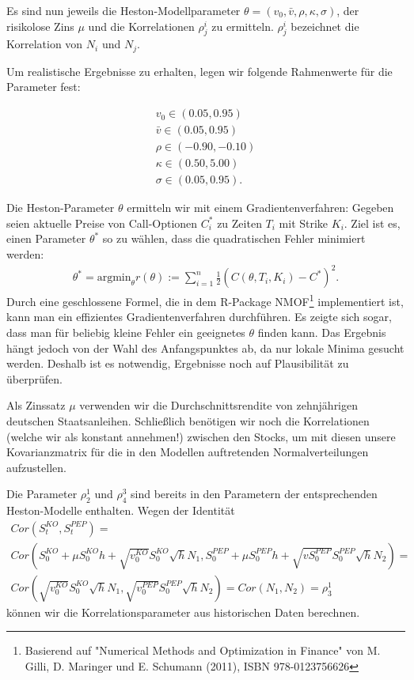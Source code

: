 \documentclass[12pt]{article}
\begin{document}
	Es sind nun jeweils die Heston-Modellparameter $\theta=(v_0,\bar v, \rho, \kappa, \sigma)$, der risikolose Zins $\mu$ und die Korrelationen $\rho^i_j$ zu ermitteln. $\rho^{i}_j$ bezeichnet die Korrelation von $N_i$ und $N_j$.
	
	Um realistische Ergebnisse zu erhalten, legen wir folgende Rahmenwerte für die Parameter fest:
	
	
	
	
	
	
	\begin{gather*}
	v_0 \in (0.05,0.95) \\
	\bar v  \in (0.05,0.95) \\
	\rho \in (-0.90,-0.10) \\
	\kappa \in (0.50,5.00) \\
	\sigma \in (0.05,0.95).
	\end{gather*}
	
	
	
	
	Die Heston-Parameter $\theta$ ermitteln wir mit einem Gradientenverfahren: Gegeben seien aktuelle Preise von Call-Optionen $C_i^*$ zu Zeiten $T_i$ mit Strike $K_i$. Ziel ist es, einen Parameter $\theta^*$ so zu wählen, dass die quadratischen Fehler minimiert werden:
	\begin{gather*}
	\theta^*=\text{argmin}_{\theta} r(\theta):=\sum_{i=1}^n \frac12 (C(\theta,T_i,K_i)-C^*)^2.
	\end{gather*}
	Durch eine geschlossene Formel, die in dem R-Package \glqq NMOF\grqq\footnote{Basierend auf "Numerical Methods and Optimization in Finance" von M. Gilli, D. Maringer und E. Schumann (2011), ISBN 978-0123756626} implementiert ist, kann man ein effizientes Gradientenverfahren durchführen. Es zeigte sich sogar, dass man für beliebig kleine Fehler ein geeignetes $\theta$ finden kann. Das Ergebnis hängt jedoch von der Wahl des Anfangspunktes ab, da nur lokale Minima gesucht werden. Deshalb ist es notwendig, Ergebnisse noch auf Plausibilität zu überprüfen.
	
	Als Zinssatz $\mu$ verwenden wir die Durchschnittsrendite von zehnjährigen deutschen Staatsanleihen. 
	Schließlich benötigen wir noch die Korrelationen (welche wir als konstant annehmen!) zwischen den Stocks, um mit diesen unsere Kovarianzmatrix für die in den Modellen auftretenden Normalverteilungen aufzustellen.
	
	Die Parameter $\rho^1_2$ und $\rho^3_4$ sind bereits in den Parametern der entsprechenden Heston-Modelle enthalten. 
	Wegen der Identität
	\begin{gather*}
	Cor(S^{KO}_t,S^{PEP}_t)= \\
	Cor\left(S^{KO}_0+\mu S^{KO}_0h+\sqrt{v^{KO}_0}S^{KO}_0\sqrt{h}N_1,S^{PEP}_0+\mu S^{PEP}_0h+\sqrt{vS^{PEP}_0}S^{PEP}_0\sqrt{h}N_2\right)= \\
	Cor\left(\sqrt{v^{KO}_0}S^{KO}_0\sqrt{h}N_1,\sqrt{v^{PEP}_0}S^{PEP}_0\sqrt{h}N_2\right)=Cor(N_1,N_2)=\rho^1_3
	\end{gather*}
	können wir die Korrelationsparameter aus historischen Daten berechnen.
	
\end{document}
